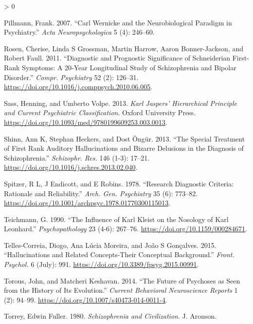 \documentclass[
]{article}
\newlength{\cslhangindent}
\newenvironment{CSLReferences}[2] %
 {%
  \setlength{\parindent}{0pt}
  \ifodd #1 \everypar{\setlength{\hangindent}{\cslhangindent}}\ignorespaces\fi
  \ifnum #2 > 0
  \setlength{\parskip}{#2\baselineskip}
  \fi
 }%
 {}
\begin{document}
\begin{CSLReferences}{1}{0}
\leavevmode\hypertarget{ref-Pillmann2007-gn}{}%
Pillmann, Frank. 2007. {``Carl Wernicke and the Neurobiological Paradigm
in Psychiatry.''} \emph{Acta Neuropsychologica} 5 (4): 246--60.

\leavevmode\hypertarget{ref-Rosen2011-gs}{}%
Rosen, Cherise, Linda S Grossman, Martin Harrow, Aaron Bonner-Jackson,
and Robert Faull. 2011. {``Diagnostic and Prognostic Significance of
Schneiderian First-Rank Symptoms: A 20-Year Longitudinal Study of
Schizophrenia and Bipolar Disorder.''} \emph{Compr. Psychiatry} 52 (2):
126--31. \url{https://doi.org/10.1016/j.comppsych.2010.06.005}.

\leavevmode\hypertarget{ref-Sass2013-fu}{}%
Sass, Henning, and Umberto Volpe. 2013. \emph{Karl Jaspers' Hierarchical
Principle and Current Psychiatric Classification}. Oxford University
Press. \url{https://doi.org/10.1093/med/9780199609253.003.0013}.

\leavevmode\hypertarget{ref-Shinn2013-nn}{}%
Shinn, Ann K, Stephan Heckers, and Dost Öngür. 2013. {``The Special
Treatment of First Rank Auditory Hallucinations and Bizarre Delusions in
the Diagnosis of Schizophrenia.''} \emph{Schizophr. Res.} 146 (1-3):
17--21. \url{https://doi.org/10.1016/j.schres.2013.02.040}.

\leavevmode\hypertarget{ref-Spitzer1978-uu}{}%
Spitzer, R L, J Endicott, and E Robins. 1978. {``Research Diagnostic
Criteria: Rationale and Reliability.''} \emph{Arch. Gen. Psychiatry} 35
(6): 773--82.
\url{https://doi.org/10.1001/archpsyc.1978.01770300115013}.

\leavevmode\hypertarget{ref-Teichmann1990-yh}{}%
Teichmann, G. 1990. {``The Influence of Karl Kleist on the Nosology of
Karl Leonhard.''} \emph{Psychopathology} 23 (4-6): 267--76.
\url{https://doi.org/10.1159/000284671}.

\leavevmode\hypertarget{ref-Telles-Correia2015-yh}{}%
Telles-Correia, Diogo, Ana Lúcia Moreira, and João S Gonçalves. 2015.
{``Hallucinations and Related Concepts-Their Conceptual Background.''}
\emph{Front. Psychol.} 6 (July): 991.
\url{https://doi.org/10.3389/fpsyg.2015.00991}.

\leavevmode\hypertarget{ref-Torous2014-zw}{}%
Torous, John, and Matcheri Keshavan. 2014. {``The Future of Psychoses as
Seen from the History of Its Evolution.''} \emph{Current Behavioral
Neuroscience Reports} 1 (2): 94--99.
\url{https://doi.org/10.1007/s40473-014-0011-4}.

\leavevmode\hypertarget{ref-Torrey1980-ca}{}%
Torrey, Edwin Fuller. 1980. \emph{Schizophrenia and Civilization}. J.
Aronson.


\end{CSLReferences}
\end{document}
